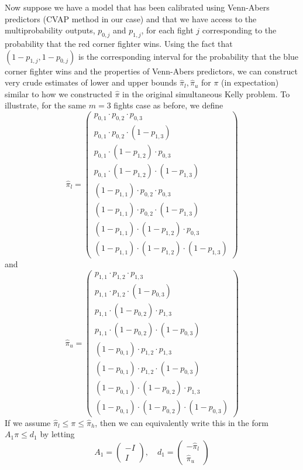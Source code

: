 \documentclass[12pt,twoside]{report}
\begin{document}
Now suppose we have a model that has been calibrated using Venn-Abers predictors (CVAP method in our case) and that we have access to the multiprobability outputs, $p_{0,j}$ and $p_{1, j}$, for each fight $j$ corresponding to the probability that the red corner fighter wins. Using the fact that $(1 - p_{1, j}, 1 - p_{0, j})$ is the corresponding interval for the probability that the blue corner fighter wins and the properties of Venn-Abers predictors, we can construct very crude estimates of lower and upper bounds $\hat{\pi}_l, \hat{\pi}_u$ for $\pi$ (in expectation) similar to how we constructed $\hat{\pi}$ in the original simultaneous Kelly problem. To illustrate, for the same $m = 3$ fights case as before, we define
$$\hat{\pi}_l = \begin{pmatrix}
    p_{0, 1} \cdot p_{0, 2} \cdot p_{0, 3} \\
    p_{0, 1} \cdot p_{0, 2} \cdot (1 - p_{1, 3}) \\
    p_{0, 1} \cdot (1 - p_{1, 2}) \cdot p_{0, 3} \\
    p_{0, 1} \cdot (1 - p_{1, 2}) \cdot (1 - p_{1, 3}) \\
    (1 - p_{1, 1}) \cdot p_{0, 2} \cdot p_{0, 3} \\
    (1 - p_{1, 1}) \cdot p_{0, 2} \cdot (1 - p_{1, 3}) \\
    (1 - p_{1, 1}) \cdot (1 - p_{1, 2}) \cdot p_{0, 3} \\
    (1 - p_{1, 1}) \cdot (1 - p_{1, 2}) \cdot (1 - p_{1, 3})
\end{pmatrix}$$
and 
$$\hat{\pi}_u = \begin{pmatrix}
    p_{1, 1} \cdot p_{1, 2} \cdot p_{1, 3} \\
    p_{1, 1} \cdot p_{1, 2} \cdot (1 - p_{0, 3}) \\
    p_{1, 1} \cdot (1 - p_{0, 2}) \cdot p_{1, 3} \\
    p_{1, 1} \cdot (1 - p_{0, 2}) \cdot (1 - p_{0, 3}) \\
    (1 - p_{0, 1}) \cdot p_{1, 2} \cdot p_{1, 3} \\
    (1 - p_{0, 1}) \cdot p_{1, 2} \cdot (1 - p_{0, 3}) \\
    (1 - p_{0, 1}) \cdot (1 - p_{0, 2}) \cdot p_{1, 3} \\
    (1 - p_{0, 1}) \cdot (1 - p_{0, 2}) \cdot (1 - p_{0, 3})
\end{pmatrix}$$
If we assume $\hat{\pi}_l \leq \pi \leq \hat{\pi}_h$, then we can equivalently write this in the form $A_1 \pi \leq d_1$ by letting
$$A_1 = \begin{pmatrix}
    -I \\
    I
\end{pmatrix}, \quad d_1 = \begin{pmatrix}
    -\hat{\pi}_l \\
    \hat{\pi}_u
\end{pmatrix}$$
\end{document}
